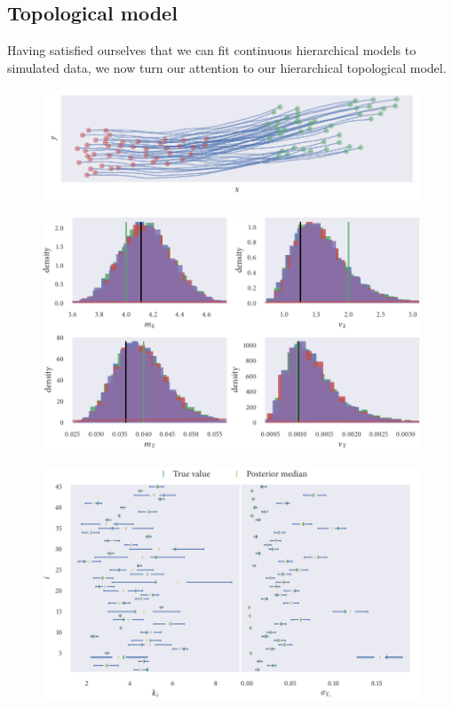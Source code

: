 \subsection{Topological model}

Having satisfied ourselves that we can fit continuous hierarchical models to simulated
data, we now turn our attention to our hierarchical topological model. 

\begin{figure}[tbp]
  \includegraphics{top_hier_sim.pdf}
  \caption{} 
\end{figure}
\begin{figure}[tbp]
  \includegraphics{top_hier_hist.pdf}
  \caption{} 
\end{figure}
\begin{figure}[tbp]
  \includegraphics{top_hier_summary.pdf}
  \caption{} 
\end{figure}

